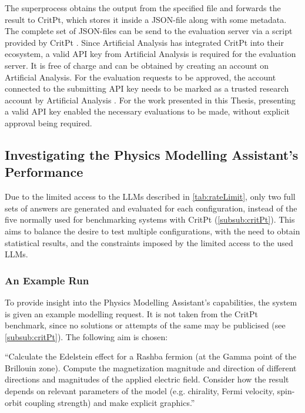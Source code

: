 \documentclass[
	fontsize = 11pt,
	paper = a4,
	draft = false,
	twoside = true,
	titlepage = false
]{scrartcl}
\numberwithin{equation}{subsection}
\begin{document}
	The superprocess obtains the output from the specified file and forwards the result to CritPt, which stores it inside a JSON-file along with some metadata. The complete set of JSON-files can be send to the evaluation server via a script provided by CritPt \autocite{critptGit}. Since Artificial Analysis \autocite{artifAna} has integrated CritPt into their ecosystem, a valid \gls{API key} from Artificial Analysis \autocite{artifAna} is required for the evaluation server. It is free of charge and can be obtained by creating an account on Artificial Analysis. For the evaluation requests to be approved, the account connected to the submitting \gls{API key} needs to be marked as a trusted research account by Artificial Analysis \autocite{artAnaTrusted}. For the work presented in this Thesis, presenting a valid \gls{API key} enabled the necessary evaluations to be made, without explicit approval being required.
	
	\subsection{Investigating the Physics Modelling Assistant's Performance} \label{sub:invPerf}
	Due to the limited access to the \gls{LLM}s described in \autoref{tab:rateLimit}, only two full sets of answers are generated and evaluated for each configuration, instead of the five normally used for benchmarking systems with CritPt (\autoref{subsub:critPt}). This aims to balance the desire to test multiple configurations, with the need to obtain statistical results, and the constraints imposed by the limited access to the used \gls{LLM}s.
	
	\subsubsection{An Example Run} \label{subsub:exRun}
	To provide insight into the Physics Modelling Assistant's capabilities, the system is given an example modelling request. It is not taken from the CritPt benchmark, since no solutions or attempts of the same may be publicised (see \autoref{subsub:critPt}). The following aim is chosen:
	
	\enquote{Calculate the Edelstein effect for a Rashba fermion (at the Gamma point of the Brillouin zone). \newline
	Compute the magnetization magnitude and direction of different directions and magnitudes of the applied electric field. \newline
	Consider how the result depends on relevant parameters of the model (e.g. chirality, Fermi velocity, spin-orbit coupling strength) and make explicit graphics.}
	
\end{document}
